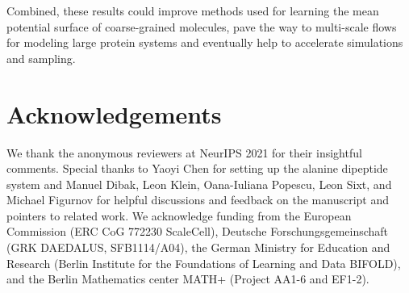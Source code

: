 \documentclass{article}
\newcommand{\TODO}[1]{{\color{orange} \textbf{TODO:} #1 }}
\begin{document}
Combined, these results could improve methods used for learning the mean potential surface of coarse-grained molecules, pave the way to multi-scale flows for modeling large protein systems and eventually help to accelerate simulations and sampling.

\newpage
\section*{Acknowledgements}
We thank the anonymous reviewers at NeurIPS 2021 for their insightful comments. Special thanks to Yaoyi Chen for setting up the alanine dipeptide system and Manuel Dibak, Leon Klein, Oana-Iuliana Popescu, Leon Sixt, and Michael Figurnov for helpful discussions and feedback on the manuscript and pointers to related work. We acknowledge funding from the European Commission (ERC CoG 772230 ScaleCell), Deutsche Forschungsgemeinschaft (GRK DAEDALUS, SFB1114/A04), the German Ministry for Education and Research (Berlin Institute for the Foundations of Learning and Data BIFOLD), and the Berlin Mathematics center MATH+ (Project AA1-6 and EF1-2).




\end{document}
